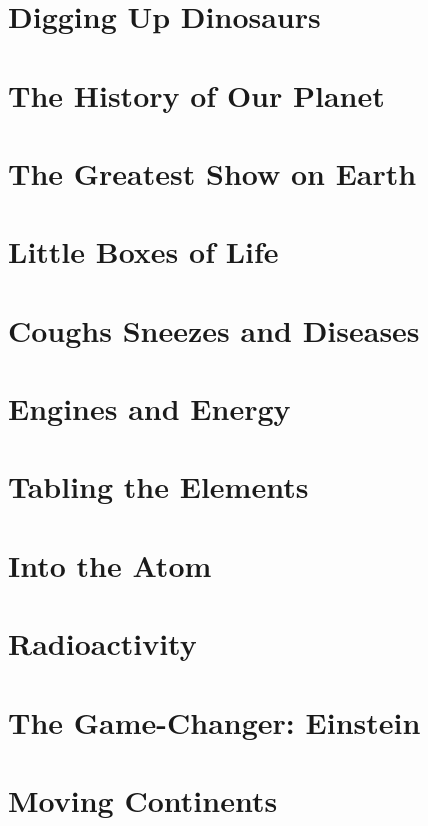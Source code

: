 \documentclass[a4paper,12pt]{article}
\begin{document}
\section{Digging Up Dinosaurs} %

\section{The History of Our Planet} %

\section{The Greatest Show on Earth} %

\section{Little Boxes of Life} %

\section{Coughs Sneezes and Diseases} %

\section{Engines and Energy} %

\section{Tabling the Elements} %

\section{Into the Atom} %

\section{Radioactivity} %

\section{The Game-Changer: Einstein} %

\section{Moving Continents} %
\end{document}
